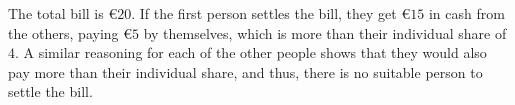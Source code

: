 \nextsample

\nextsample
The total bill is €$20$.
If the first person settles the bill, they get €$15$ in cash from the
others, paying €$5$ by themselves, which is more than their individual share of $4$.
A similar reasoning for each of the other people shows that they would also pay
more than their individual share, and thus, there is no suitable person to settle the bill.